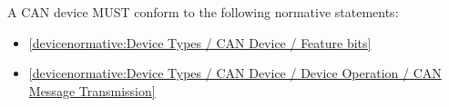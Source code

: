 \label{sec:Conformance / Device Conformance / CAN Device Conformance}

A CAN device MUST conform to the following normative statements:

\begin{itemize}
\item \ref{devicenormative:Device Types / CAN Device / Feature bits}
\item \ref{devicenormative:Device Types / CAN Device / Device Operation / CAN Message Transmission}
\end{itemize}
